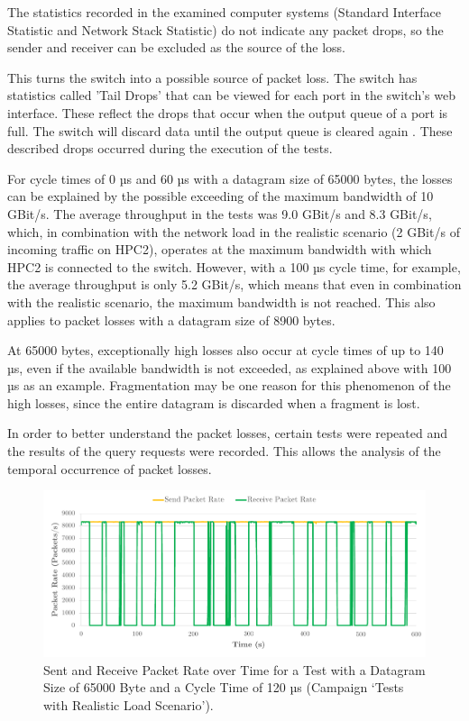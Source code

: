 The statistics recorded in the examined computer systems (Standard Interface Statistic and Network Stack Statistic) do not indicate any packet drops, so the sender and receiver can be excluded as the source of the loss.

This turns the switch into a possible source of packet loss. The switch has statistics called 'Tail Drops' that can be viewed for each port in the switch's web interface. These reflect the drops that occur when the output queue of a port is full. The switch will discard data until the output queue is cleared again \cite {reli02}. These described drops occurred during the execution of the tests.

For cycle times of 0 µs and 60 µs with a datagram size of 65000 bytes, the losses can be explained by the possible exceeding of the maximum bandwidth of 10 GBit/s. The average throughput in the tests was 9.0 GBit/s and 8.3 GBit/s, which, in combination with the network load in the realistic scenario (2 GBit/s of incoming traffic on HPC2), operates at the maximum bandwidth with which HPC2 is connected to the switch. However, with a 100 µs cycle time, for example, the average throughput is only 5.2 GBit/s, which means that even in combination with the realistic scenario, the maximum bandwidth is not reached. This also applies to packet losses with a datagram size of 8900 bytes.

At 65000 bytes, exceptionally high losses also occur at cycle times of up to 140 µs, even if the available bandwidth is not exceeded, as explained above with 100 µs as an example. Fragmentation may be one reason for this phenomenon of the high losses, since the entire datagram is discarded when a fragment is lost.

In order to better understand the packet losses, certain tests were repeated and the results of the query requests were recorded. This allows the analysis of the temporal occurrence of packet losses.

\begin{figure}[h!]
    \centering
    \includegraphics[width=1\linewidth]{figures/reliability/star/rel_d_4.pdf}
    \caption{Sent and Receive Packet Rate over Time for a Test with a Datagram Size of 65000 Byte and a Cycle Time of 120 µs (Campaign `Tests with Realistic Load Scenario').}
    \label{fig:srpr4}
\end{figure}

